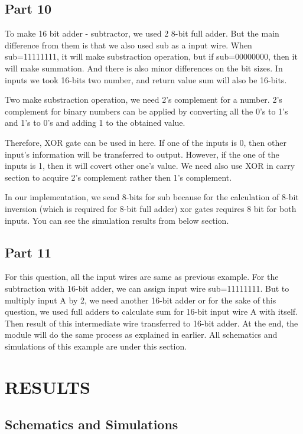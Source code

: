 \documentclass[pdftex,12pt,a4paper]{article}
\begin{document}
\subsection{Part 10}
To make 16 bit adder - subtractor, we used 2 8-bit full adder. But the main difference from them is that we also used sub as a input wire. When sub=11111111, it will make substraction operation, but if sub=00000000, then it will make summation. And there is also minor differences on the bit sizes. In inputs we took 16-bits two number, and return value sum will also be 16-bits. 

Two make substraction operation, we need 2's complement for a number. 2's complement for binary numbers can be applied by converting all the 0's to 1's and 1's to 0's and adding 1 to the obtained value.

Therefore, XOR gate can be used in here. If one of the inputs is 0, then other input's information will be transferred to output. However, if the one of the inputs is 1, then it will covert other one's value. We need also use XOR in carry section to acquire 2's complement rather then 1's complement. 

In our implementation, we send 8-bits for sub because for the calculation of 8-bit inversion (which is required for 8-bit full adder) xor gates requires 8 bit for both inputs. You can see the simulation results from below section.


\subsection{Part 11}
For this question, all the input wires are same as previous example. For the subtraction with 16-bit adder, we can assign input wire sub=11111111. But to multiply input A by 2, we need another 16-bit adder or for the sake of this question, we used full adders to calculate sum for 16-bit input wire A with itself. Then result of this intermediate wire transferred to 16-bit adder. At the end, the module will do the same process as explained in earlier. All schematics and simulations of this example are under this section.



\section{RESULTS}
\subsection{Schematics and Simulations}
\end{document}
